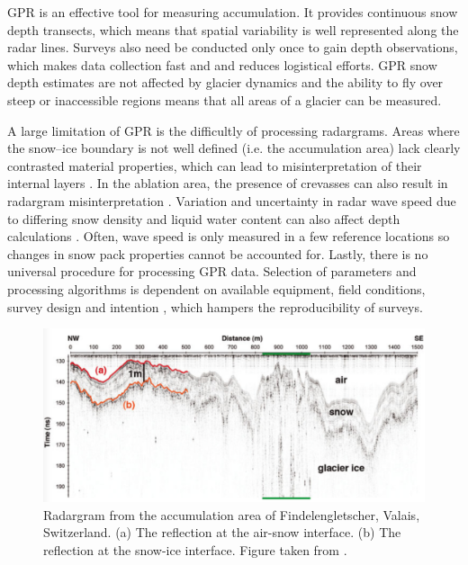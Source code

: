\documentclass{sfuthesis}
\begin{document}
GPR is an effective tool for measuring accumulation. It provides continuous snow depth transects, which means that spatial variability is well represented along the radar lines. Surveys also need be conducted only once to gain depth observations, which makes data collection fast and and reduces logistical efforts\citep{Machguth2006}. GPR snow depth estimates are not affected by glacier dynamics and the ability to fly over steep or inaccessible regions means that all areas of a glacier can be measured. 

A large limitation of GPR is the difficultly of processing radargrams. Areas where the snow--ice boundary is not well defined (i.e. the accumulation area) lack clearly contrasted material properties, which can lead to misinterpretation of their internal layers \citep{McGrath2015}. In the ablation area, the presence of crevasses can also result in radargram misinterpretation \citep{Machguth2006}. Variation and uncertainty in radar wave speed due to differing snow density and liquid water content can also affect depth calculations \citep{Sold2013}. Often, wave speed is only measured in a few reference locations so changes in snow pack properties cannot be accounted for. Lastly, there is no universal procedure for processing GPR data. Selection of parameters and processing algorithms is dependent on available equipment, field conditions, survey design and intention \citep{Sold2013}, which hampers the reproducibility of surveys.

\begin{figure}
 \centering
      \includegraphics[width=\textwidth]{gpr.png}
  \caption{Radargram from the accumulation area of Findelengletscher, Valais, Switzerland. (a) The reflection at the air-snow interface. (b) The reflection at the snow-ice interface. Figure taken from \cite{Sold2013}.}
        \label{gpr}
\end{figure}
\end{document}
